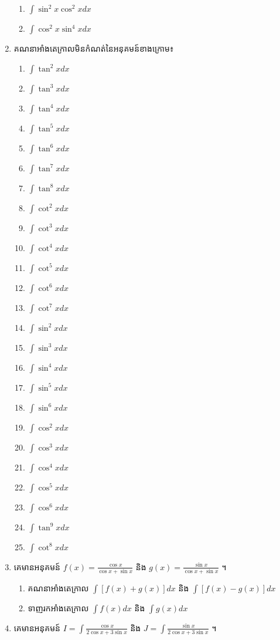 \documentclass[12pt, a4paper]{article}
\begin{document}
\begin{enumerate}[m]
\begin{enumerate}[k, 3]
			\item $\int \sin^2x\cos^2x dx$
			\item $\int \cos^2x\sin^4x dx$
		\end{enumerate}
		\item គណនាអាំងតេក្រាលមិនកំណត់នៃអនុគមន៍ខាងក្រោម៖
		\begin{enumerate}[k, 3]
			\item $\int \tan^2x dx$
			\item $\int \tan^3x dx$
			\item $\int \tan^4x dx$
			\item $\int \tan^5x dx$
			\item $\int \tan^6x dx$
			\item $\int \tan^7x dx$
			\item $\int \tan^8x dx$
			\item $\int \cot^2x dx$
			\item $\int \cot^3x dx$
			\item $\int \cot^4x dx$
			\item $\int \cot^5x dx$
			\item $\int \cot^6x dx$
			\item $\int \cot^7x dx$
			\item $\int \sin^2x dx$
			\item $\int \sin^3x dx$
			\item $\int \sin^4x dx$
			\item $\int \sin^5x dx$
			\item $\int \sin^6x dx$
			\item $\int \cos^2x dx$
			\item $\int \cos^3x dx$
			\item $\int \cos^4x dx$
			\item $\int \cos^5x dx$
			\item $\int \cos^6x dx$
			\item $\int \tan^9x dx$
			\item $\int \cot^8x dx$
		\end{enumerate}
	\item គេមានអនុគមន៍ $f(x)=\frac{\cos x}{\cos x+\sin x}$ និង $g(x)=\frac{\sin x}{\cos x+\sin x}$ ។
	\begin{enumerate}[k]
		\item គណនាអាំងតេក្រាល $\int [f(x)+g(x)] dx$ និង $\int [f(x)-g(x)] dx$
		\item ទាញរកអាំងតេក្រាល $\int f(x) dx$ និង $\int g(x) dx$
	\end{enumerate}
	\item គេមានអនុគមន៍ $I=\int \frac{\cos x}{2\cos x+3\sin x}$ និង $J=\int \frac{\sin x}{2\cos x+3\sin x}$ ។

\end{enumerate}
\end{document}
